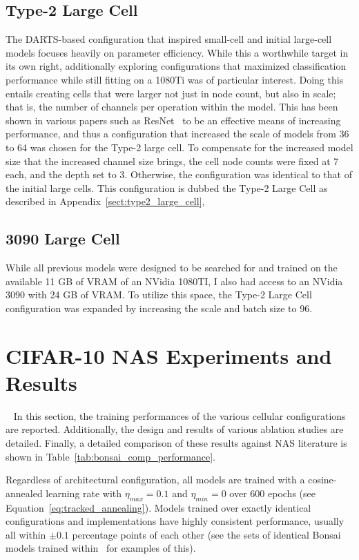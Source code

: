 \subsection{Type-2 Large Cell}
The DARTS-based configuration that inspired small-cell and initial large-cell models focuses heavily on parameter efficiency.
While this a worthwhile
target in its own right, additionally exploring configurations that maximized classification performance while
still fitting on a 1080Ti was of particular interest. Doing this entails creating cells that were larger not just in node count, but also in scale;
that is, the number of channels per operation within the model. This has been shown in various papers such as ResNet~\citep{szegedy2014}
to be an effective means of increasing performance, and thus a configuration that increased the scale of models
from 36 to 64 was chosen for the Type-2 large cell.
To compensate for the increased model size that the increased channel size brings, the cell node counts were
fixed at 7 each, and the depth set to 3. Otherwise, the configuration was identical to that of the initial large
cells. This configuration is dubbed the Type-2 Large Cell as described in Appendix~\ref{sect:type2_large_cell},

\subsection{3090 Large Cell}
While all previous models were designed to be searched for and trained on the available 11 GB of VRAM of an NVidia 1080TI,
I also had access to an NVidia 3090 with 24 GB of VRAM. To utilize this space, the Type-2 Large Cell
configuration was expanded by increasing the scale and batch size to 96.


\section{CIFAR-10 NAS Experiments and Results}~\label{sect:bonsai_training_details}
In this section, the training performances of the various cellular configurations are reported. Additionally, the
design and results of various ablation studies are detailed. Finally, a detailed comparison of these results against
NAS literature is shown in Table~\ref{tab:bonsai_comp_performance}.

Regardless of architectural configuration, all models are trained with a cosine-annealed
learning rate with $\eta_{max}=0.1$ and $\eta_{min}=0$ over 600 epochs (see Equation~\ref{eq:tracked_annealing}).
Models trained over exactly identical
configurations and implementations have highly consistent performance, usually  all within $\pm0.1$ percentage points of
each other (see the sets of identical Bonsai models trained within~\cite{geada2020} for examples of this).

